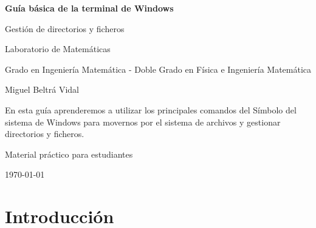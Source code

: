 \documentclass[11pt,a4paper]{article}
\begin{document}
\begin{titlepage}
    \centering

    \vspace*{2cm}

    {\Huge\bfseries Guía básica de la terminal de Windows\par}

    \vspace{1cm}

    {\Large Gestión de directorios y ficheros\par}

    \vspace{1cm}
    
    {\Large Laboratorio de Matemáticas\par}

    \vspace{1cm}

	{Grado en Ingeniería Matemática - Doble Grado en Física e Ingeniería Matemática\par}

    \vspace{1cm}

    {\Large Miguel Beltrá Vidal\par}

    \vfill
    
    \begin{tcolorbox}[width=0.8\textwidth]
    En esta guía aprenderemos a utilizar los principales comandos
    del Símbolo del sistema de Windows para movernos por el sistema
    de archivos y gestionar directorios y ficheros.
    \end{tcolorbox}

    \vfill

    {\large Material práctico para estudiantes\par}

    \vspace{0.5cm}

    {\large \today\par}

\end{titlepage}

\tableofcontents
\newpage

\section{Introducción}
\end{document}
